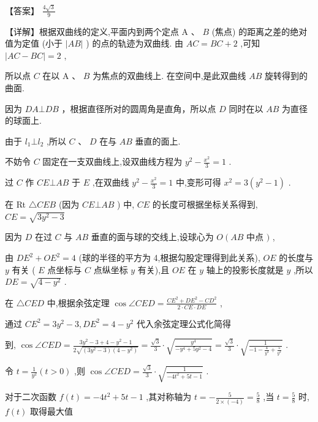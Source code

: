 \documentclass[10pt]{article}
\begin{document}
【答案】 \(\frac{4\sqrt{3}}{9}\)

【详解】根据双曲线的定义,平面内到两个定点 \(\mathrm{A}\text{ 、 }B\) (焦点) 的距离之差的绝对值为定值 (小于 \(\left| {AB}\right|\) ) 的点的轨迹为双曲线. 由 \({AC} = {BC} + 2\) ,可知 \(\left| {{AC} - {BC}}\right|  = 2\) ,

所以点 \(C\) 在以 \(\mathrm{A}\text{ 、 }B\) 为焦点的双曲线上. 在空间中,是此双曲线 \({AB}\) 旋转得到的曲面.

因为 \({DA}\bot {DB}\) ，根据直径所对的圆周角是直角，所以点 \(D\) 同时在以 \({AB}\) 为直径的球面上.

由于 \({l}_{1} \bot  {l}_{2}\) ,所以 \(C\text{ 、 }D\) 在与 \({AB}\) 垂直的面上.

不妨令 \(C\) 固定在一支双曲线上,设双曲线方程为 \({y}^{2} - \frac{{x}^{2}}{3} = 1\) .

过 \(C\) 作 \({CE} \bot  {AB}\) 于 \(E\) ,在双曲线 \({y}^{2} - \frac{{x}^{2}}{3} = 1\) 中,变形可得 \({x}^{2} = 3\left( {{y}^{2} - 1}\right)\) .

在 Rt \(\bigtriangleup {CEB}\) (因为 \({CE}\bot {AB}\) ) 中, \({CE}\) 的长度可根据坐标关系得到, \({CE} = \sqrt{3{y}^{2} - 3}\)

因为 \(D\) 在过 \(C\) 与 \({AB}\) 垂直的面与球的交线上,设球心为 \(O\left( {AB}\right.\) 中点 \()\) ,

由 \(D{E}^{2} + O{E}^{2} = 4\) (球的半径的平方为 4,根据勾股定理得到此关系), \({OE}\) 的长度与 \(y\) 有关 ( \(E\) 点坐标与 \(C\) 点纵坐标 \(y\) 有关),且 \({OE}\) 在 \(y\) 轴上的投影长度就是 \(y\) ,所以 \({DE} = \sqrt{4 - {y}^{2}}\) .

在 \(\bigtriangleup {CED}\) 中,根据余弦定理 \(\cos \angle {CED} = \frac{C{E}^{2} + D{E}^{2} - C{D}^{2}}{2 \cdot  {CE} \cdot  {DE}}\) ,

通过 \(C{E}^{2} = 3{y}^{2} - 3,D{E}^{2} = 4 - {y}^{2}\) 代入余弦定理公式化简得

到, \(\cos \angle {CED} = \frac{3{y}^{2} - 3 + 4 - {y}^{2} - 1}{2\sqrt{\left( {3{y}^{2} - 3}\right) \left( {4 - {y}^{2}}\right) }} = \frac{\sqrt{3}}{3} \cdot  \sqrt{\frac{{y}^{4}}{-{y}^{4} + 5{y}^{2} - 4}} = \frac{\sqrt{3}}{3} \cdot  \sqrt{\frac{1}{-1 - \frac{4}{{y}^{4}} + \frac{5}{{y}^{2}}}}\) .

令 \(t = \frac{1}{{y}^{2}}\left( {t > 0}\right)\) ,则 \(\cos \angle {CED} = \frac{\sqrt{3}}{3} \cdot  \sqrt{\frac{1}{-4{t}^{2} + {5t} - 1}}\) .

对于二次函数 \(f\left( t\right)  =  - 4{t}^{2} + {5t} - 1\) ,其对称轴为 \(t =  - \frac{5}{2 \times  \left( {-4}\right) } = \frac{5}{8}\) ,当 \(t = \frac{5}{8}\) 时, \(f\left( t\right)\) 取得最大值
\end{document}
